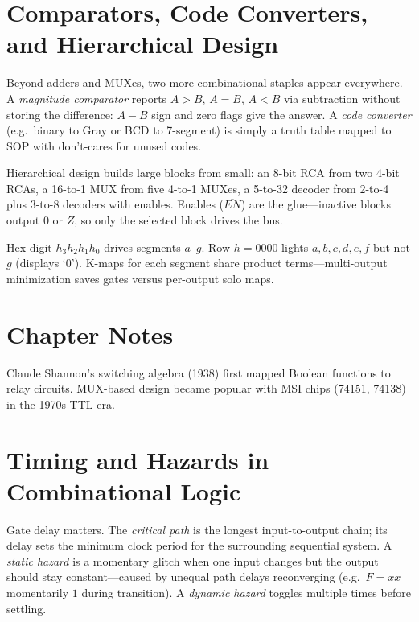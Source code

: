 \section{Comparators, Code Converters, and Hierarchical Design}
Beyond adders and MUXes, two more combinational staples appear everywhere.
A \emph{magnitude comparator} reports $A>B$, $A=B$, $A<B$ via subtraction without storing the difference:
$A-B$ sign and zero flags give the answer. A \emph{code converter} (e.g.\ binary to Gray or BCD to 7-segment)
is simply a truth table mapped to SOP with don't-cares for unused codes.

Hierarchical design builds large blocks from small: an 8-bit RCA from two 4-bit RCAs, a 16-to-1 MUX from five 4-to-1 MUXes,
a 5-to-32 decoder from 2-to-4 plus 3-to-8 decoders with enables. Enables ($\overline{EN}$) are the glue---inactive blocks
output $0$ or $Z$, so only the selected block drives the bus.
\begin{example}
Hex digit $h_3h_2h_1h_0$ drives segments $a$--$g$. Row $h=0000$ lights $a,b,c,d,e,f$ but not $g$ (displays `0').
K-maps for each segment share product terms---multi-output minimization saves gates versus per-output solo maps.
\end{example}


\section{Chapter Notes}
Claude Shannon's switching algebra (1938) first mapped Boolean functions to relay circuits.
MUX-based design became popular with MSI chips (74151, 74138) in the 1970s TTL era.

\section{Timing and Hazards in Combinational Logic}
Gate delay matters. The \emph{critical path} is the longest input-to-output chain; its delay sets the minimum clock period
for the surrounding sequential system. A \emph{static hazard} is a momentary glitch when one input changes but the output
should stay constant---caused by unequal path delays reconverging (e.g.\ $F=x\bar x$ momentarily $1$ during transition).
A \emph{dynamic hazard} toggles multiple times before settling.


